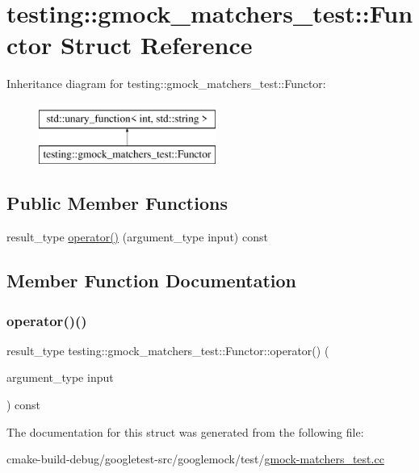 \hypertarget{structtesting_1_1gmock__matchers__test_1_1Functor}{}\section{testing\+::gmock\+\_\+matchers\+\_\+test\+::Functor Struct Reference}
\label{structtesting_1_1gmock__matchers__test_1_1Functor}
Inheritance diagram for testing\+::gmock\+\_\+matchers\+\_\+test\+::Functor\+:\begin{figure}[H]
\begin{center}
\leavevmode
\includegraphics[height=2.000000cm]{structtesting_1_1gmock__matchers__test_1_1Functor}
\end{center}
\end{figure}
\subsection*{Public Member Functions}
\begin{DoxyCompactItemize}
\item 
result\+\_\+type \mbox{\hyperlink{structtesting_1_1gmock__matchers__test_1_1Functor_a5beee965d62e6bc1d591163659bad913}{operator()}} (argument\+\_\+type input) const
\end{DoxyCompactItemize}


\subsection{Member Function Documentation}
\mbox{\label{structtesting_1_1gmock__matchers__test_1_1Functor_a5beee965d62e6bc1d591163659bad913}} 
\subsubsection{\texorpdfstring{operator()()}{operator()()}}
{\footnotesize\ttfamily result\+\_\+type testing\+::gmock\+\_\+matchers\+\_\+test\+::\+Functor\+::operator() (\begin{DoxyParamCaption}\item[{argument\+\_\+type}]{input }\end{DoxyParamCaption}) const\hspace{0.3cm}{\ttfamily [inline]}}



The documentation for this struct was generated from the following file\+:\begin{DoxyCompactItemize}
\item 
cmake-\/build-\/debug/googletest-\/src/googlemock/test/\mbox{\hyperlink{gmock-matchers__test_8cc}{gmock-\/matchers\+\_\+test.\+cc}}\end{DoxyCompactItemize}
